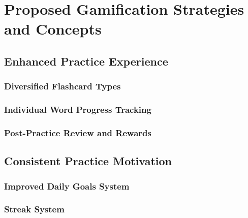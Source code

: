 \chapter{Proposed Gamification Strategies and Concepts}

\section{Enhanced Practice Experience}

\subsection{Diversified Flashcard Types}

\subsection{Individual Word Progress Tracking}

\subsection{Post-Practice Review and Rewards}

\section{Consistent Practice Motivation}

\subsection{Improved Daily Goals System}

\subsection{Streak System}
